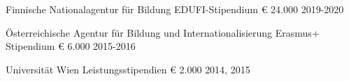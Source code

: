 \begin{cvhonors}

  \cvhonor
    {Finnische Nationalagentur für Bildung} %
    {EDUFI-Stipendium} %
    {€ 24.000} %
    {2019-2020} %
    
  \cvhonor
    {Österreichische Agentur für Bildung und Internationalisierung} %
    {Erasmus+ Stipendium} %
    {€ 6.000} %
    {2015-2016} %

  \cvhonor
    {Universität Wien} %
    {Leistungsstipendien} %
    {€ 2.000} %
    {2014, 2015} %
\end{cvhonors}
